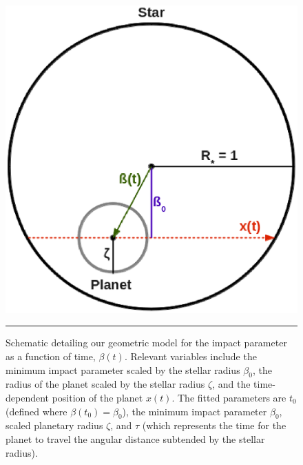 \begin{figure}[t] 
  \begin{minipage}[c]{0.37\textwidth}
    \includegraphics[width=\textwidth]{figures/schem.eps}
  \end{minipage}\hfill
  \begin{minipage}[c]{0.6\textwidth}
    \caption{Schematic detailing our geometric model for the impact
      parameter as a function of time, $\beta(t)$.  Relevant variables
      include the minimum impact parameter scaled by the stellar radius
      $\beta_0$, the radius of the planet scaled by the stellar radius
      $\zeta$, and the time-dependent position of the planet $x(t)$.  The
      fitted parameters are $t_0$ (defined where $\beta(t_0) = \beta_0$),
      the minimum impact parameter $\beta_0$, scaled planetary radius
      $\zeta$, and $\tau$ (which represents the time for the planet to
      travel the angular distance subtended by the stellar radius). }
    \label{fig-schem}
    \hspace*{\fill}  
    \hrule
  \end{minipage}
\end{figure}

\medskip
{\centerline{}}
\smallskip


